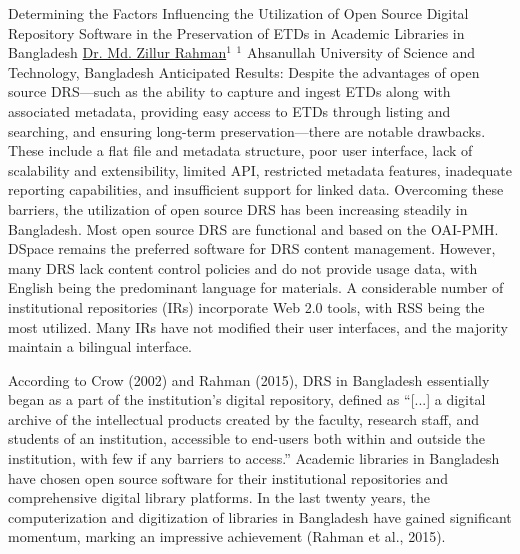 \begin{abstract_online}{Determining the Factors Influencing the Utilization of Open Source Digital Repository Software in the Preservation of ETDs in Academic Libraries in Bangladesh}{%
    \underline{Dr. Md. Zillur Rahman}$^{1}$}{%
    }{%
    $^1$ Ahsanullah University of Science and Technology, Bangladesh
}
Anticipated Results: Despite the advantages of open source DRS—such as the ability to capture and ingest ETDs along with associated metadata, providing easy access to ETDs through listing and searching, and ensuring long-term preservation—there are notable drawbacks. These include a flat file and metadata structure, poor user interface, lack of scalability and extensibility, limited API, restricted metadata features, inadequate reporting capabilities, and insufficient support for linked data. Overcoming these barriers, the utilization of open source DRS has been increasing steadily in Bangladesh. Most open source DRS are functional and based on the OAI-PMH. DSpace remains the preferred software for DRS content management. However, many DRS lack content control policies and do not provide usage data, with English being the predominant language for materials. A considerable number of institutional repositories (IRs) incorporate Web 2.0 tools, with RSS being the most utilized. Many IRs have not modified their user interfaces, and the majority maintain a bilingual interface.

According to Crow (2002) and Rahman (2015), DRS in Bangladesh essentially began as a part of the institution's digital repository, defined as “[...] a digital archive of the intellectual products created by the faculty, research staff, and students of an institution, accessible to end-users both within and outside the institution, with few if any barriers to access.” Academic libraries in Bangladesh have chosen open source software for their institutional repositories and comprehensive digital library platforms. In the last twenty years, the computerization and digitization of libraries in Bangladesh have gained significant momentum, marking an impressive achievement (Rahman et al., 2015).

\end{abstract_online}

